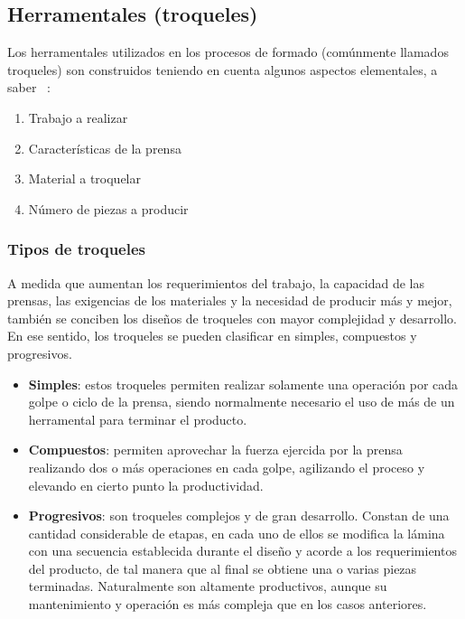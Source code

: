 \subsection{Herramentales (troqueles)}

Los herramentales utilizados en los procesos de formado (comúnmente llamados troqueles) son 
construidos teniendo en cuenta algunos aspectos elementales, a saber ~\cite{marin2009}:

\begin{enumerate}
\item Trabajo a realizar 
\item Características de la prensa
\item Material a troquelar
\item Número de piezas a producir
\end{enumerate}

\subsubsection{Tipos de troqueles}

A medida que aumentan los requerimientos del trabajo, la capacidad de las prensas, las exigencias 
de los materiales y la necesidad de producir más y mejor, también se conciben los diseños de 
troqueles con mayor complejidad y desarrollo. En ese sentido, los troqueles se pueden clasificar 
en simples, compuestos y progresivos.

\begin{itemize}
\item \textbf{Simples}: estos troqueles permiten realizar solamente una operación por cada golpe o 
ciclo de la prensa, siendo normalmente necesario el uso de más de un herramental para terminar el producto.

\item \textbf{Compuestos}: permiten aprovechar la fuerza ejercida por la prensa realizando dos 
o más operaciones en cada golpe, agilizando el proceso y elevando en cierto punto 
la productividad.

\item \textbf{Progresivos}: son troqueles complejos y de gran desarrollo. Constan de una 
cantidad considerable de etapas, en cada uno de ellos se modifica la lámina con una secuencia 
establecida durante el diseño y acorde a los requerimientos del producto, de tal manera 
que al final se obtiene una o varias piezas terminadas. Naturalmente son altamente productivos, 
aunque su mantenimiento y operación es más compleja que en los casos anteriores.
\end{itemize}

